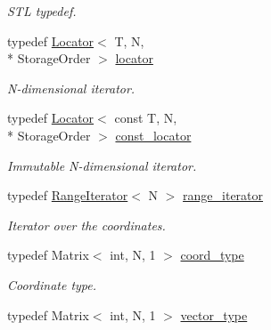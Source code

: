\begin{DoxyCompactItemize}
\begin{DoxyCompactList}\small\item\em S\-T\-L typedef. \end{DoxyCompactList}\item 
\hypertarget{class_d_o_1_1_multi_array_ad121376b4c75b70d8dbbf614aa8c238a}{typedef \hyperlink{class_d_o_1_1_multi_array_ae272211659151c529353c4cf96a980d0}{Locator}$<$ T, N, \\*
Storage\-Order $>$ \hyperlink{class_d_o_1_1_multi_array_ad121376b4c75b70d8dbbf614aa8c238a}{locator}}\label{class_d_o_1_1_multi_array_ad121376b4c75b70d8dbbf614aa8c238a}

\begin{DoxyCompactList}\small\item\em N-\/dimensional iterator. \end{DoxyCompactList}\item 
\hypertarget{class_d_o_1_1_multi_array_a4a50c3fdef274a291b3fc257677bea28}{typedef \hyperlink{class_d_o_1_1_multi_array_ae272211659151c529353c4cf96a980d0}{Locator}$<$ const T, N, \\*
Storage\-Order $>$ \hyperlink{class_d_o_1_1_multi_array_a4a50c3fdef274a291b3fc257677bea28}{const\-\_\-locator}}\label{class_d_o_1_1_multi_array_a4a50c3fdef274a291b3fc257677bea28}

\begin{DoxyCompactList}\small\item\em Immutable N-\/dimensional iterator. \end{DoxyCompactList}\item 
\hypertarget{class_d_o_1_1_multi_array_a993ff1bd1b7d3a67eeea283b48b1b346}{typedef \hyperlink{class_d_o_1_1_multi_array_a9ac449a0d117e31fa565a7f41e02a748}{Range\-Iterator}$<$ N $>$ \hyperlink{class_d_o_1_1_multi_array_a993ff1bd1b7d3a67eeea283b48b1b346}{range\-\_\-iterator}}\label{class_d_o_1_1_multi_array_a993ff1bd1b7d3a67eeea283b48b1b346}

\begin{DoxyCompactList}\small\item\em Iterator over the coordinates. \end{DoxyCompactList}\item 
\hypertarget{class_d_o_1_1_multi_array_ae4fb477425bbeb20329d300396ac2582}{typedef Matrix$<$ int, N, 1 $>$ \hyperlink{class_d_o_1_1_multi_array_ae4fb477425bbeb20329d300396ac2582}{coord\-\_\-type}}\label{class_d_o_1_1_multi_array_ae4fb477425bbeb20329d300396ac2582}

\begin{DoxyCompactList}\small\item\em Coordinate type. \end{DoxyCompactList}\item 
\hypertarget{class_d_o_1_1_multi_array_aacf98e49e90f9aeead0ff8885fae3ac7}{typedef Matrix$<$ int, N, 1 $>$ \hyperlink{class_d_o_1_1_multi_array_aacf98e49e90f9aeead0ff8885fae3ac7}{vector\-\_\-type}}\label{class_d_o_1_1_multi_array_aacf98e49e90f9aeead0ff8885fae3ac7}


\end{DoxyCompactItemize}
